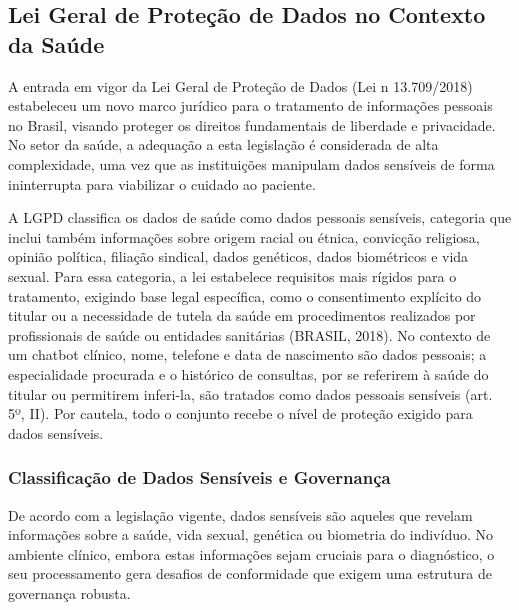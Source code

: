 \documentclass[12pt,a4paper]{extarticle}
\begin{document}
\subsection{Lei Geral de Proteção de Dados no Contexto da Saúde}
\label{sec:lgpd}

A entrada em vigor da Lei Geral de Proteção de Dados (Lei n\textordmasculine{} 13.709/2018) estabeleceu um novo marco jurídico para o tratamento de informações pessoais no Brasil, visando proteger os direitos fundamentais de liberdade e privacidade. No setor da saúde, a adequação a esta legislação é considerada de alta complexidade, uma vez que as instituições manipulam dados sensíveis de forma ininterrupta para viabilizar o cuidado ao paciente.

A LGPD classifica os dados de saúde como dados pessoais sensíveis, categoria que inclui também informações sobre origem racial ou étnica, convicção religiosa, opinião política, filiação sindical, dados genéticos, dados biométricos e vida sexual. Para essa categoria, a lei estabelece requisitos mais rígidos para o tratamento, exigindo base legal específica, como o consentimento explícito do titular ou a necessidade de tutela da saúde em procedimentos realizados por profissionais de saúde ou entidades sanitárias (BRASIL, 2018). No contexto de um chatbot clínico, nome, telefone e data de nascimento são dados pessoais; a especialidade procurada e o histórico de consultas, por se referirem à saúde do titular ou permitirem inferi-la, são tratados como dados pessoais sensíveis (art. 5º, II). Por cautela, todo o conjunto recebe o nível de proteção exigido para dados sensíveis.

\subsubsection{Classificação de Dados Sensíveis e Governança}

De acordo com a legislação vigente, dados sensíveis são aqueles que revelam informações sobre a saúde, vida sexual, genética ou biometria do indivíduo. No ambiente clínico, embora estas informações sejam cruciais para o diagnóstico, o seu processamento gera desafios de conformidade que exigem uma estrutura de governança robusta.

\end{document}
